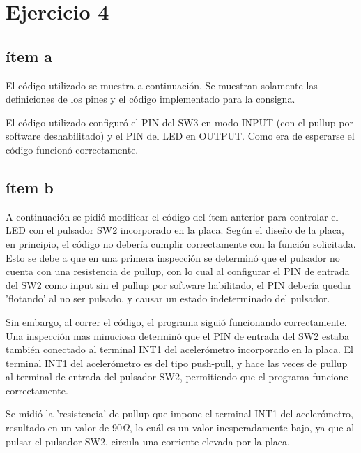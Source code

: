 \documentclass[micros_g1_main.tex]{subfiles}
\begin{document}
\section{Ejercicio 4}
\subsection{ítem a}
El código utilizado se muestra a continuación. Se muestran solamente las definiciones de los pines y el código implementado para la consigna.

El código utilizado configuró el PIN del SW3 en modo INPUT (con el pullup por software deshabilitado) y el PIN del LED en OUTPUT. Como era de esperarse el código funcionó correctamente.

\subsection{ítem b}
A continuación se pidió modificar el código del ítem anterior para controlar el LED con el pulsador SW2 incorporado en la placa. Según el diseño de la placa, en principio, el código no debería cumplir correctamente con la función solicitada. Esto se debe a que en una primera inspección se determinó que el pulsador no cuenta con una resistencia de pullup, con lo cual al configurar el PIN de entrada del SW2 como input sin el pullup por software habilitado, el PIN debería quedar 'flotando' al no ser pulsado, y causar un estado indeterminado del pulsador.

Sin embargo, al correr el código, el programa siguió funcionando correctamente. Una inspección mas minuciosa determinó que el PIN de entrada del SW2 estaba también conectado al terminal INT1 del acelerómetro incorporado en la placa. El terminal INT1 del acelerómetro es del tipo push-pull, y hace las veces de pullup al terminal de entrada del pulsador SW2, permitiendo que el programa funcione correctamente.

Se midió la 'resistencia' de pullup que impone el terminal INT1 del acelerómetro, resultado en un valor de 90$\Omega$, lo cuál es un valor inesperadamente bajo, ya que al pulsar el pulsador SW2, circula una corriente elevada por la placa.
\end{document}

